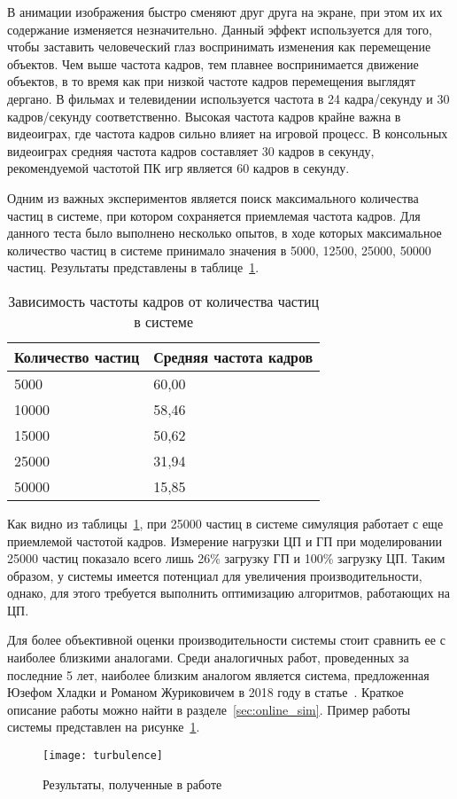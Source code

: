 В анимации изображения быстро сменяют друг друга на экране, при этом их их
содержание изменяется незначительно. Данный эффект используется для того, чтобы
заставить человеческий глаз воспринимать изменения как перемещение объектов. Чем
выше частота кадров, тем плавнее воспринимается движение объектов, в то время
как при низкой частоте кадров перемещения выглядят дергано. В фильмах и
телевидении используется частота в 24 кадра/секунду и 30 кадров/секунду
соответственно. Высокая частота кадров крайне важна в видеоиграх, где частота
кадров сильно влияет на игровой процесс. В консольных видеоиграх средняя частота
кадров составляет 30 кадров в секунду, рекомендуемой частотой ПК игр является 60
кадров в секунду.

Одним из важных экспериментов является поиск максимального количества частиц в
системе, при котором сохраняется приемлемая частота кадров. Для данного теста
было выполнено несколько опытов, в ходе которых максимальное количество частиц в
системе принимало значения в 5000, 12500, 25000, 50000 частиц. Результаты
представлены в таблице~\ref{table:amountBench}.
\begin{table}[htb]
\caption{Зависимость частоты кадров от количества частиц в системе}%
\label{table:amountBench}
\centering
\small
\begin{tabular}{| l | l |}
    \hline
    Количество частиц & Средняя частота кадров \\
    \hline
    5000 &  60,00 \\
    \hline
    10000 & 58,46 \\
    \hline
    15000 & 50,62 \\
    \hline
    25000 & 31,94 \\
    \hline
    50000 & 15,85 \\
    \hline
\end{tabular}
\end{table}

Как видно из таблицы~\ref{table:amountBench}, при 25000 частиц в системе
симуляция работает с еще приемлемой частотой кадров. Измерение нагрузки ЦП и ГП
при моделировании 25000 частиц показало всего лишь 26\% загрузку ГП и 100\%
загрузку ЦП. Таким образом, у системы имеется потенциал для увеличения
производительности, однако, для этого требуется выполнить оптимизацию
алгоритмов, работающих на ЦП.

Для более объективной оценки производительности системы стоит сравнить ее с
наиболее близкими аналогами. Среди аналогичных работ, проведенных за последние 5
лет, наиболее близким аналогом является система, предложенная Юзефом Хладки и
Романом Журиковичем в 2018 году в статье~\cite{turbulence}. Краткое описание
работы можно найти в разделе~\ref{sec:online_sim}. Пример работы системы
представлен на рисунке~\ref{fig:turbulence}.
\begin{figure}[htb]
	\centering
    \texttt{[image: turbulence]}
    \caption{Результаты, полученные в работе~\cite{turbulence}}%
    \label{fig:turbulence}
\end{figure}

